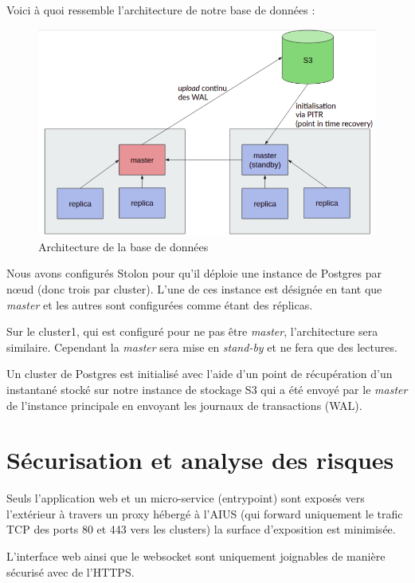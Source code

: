 Voici à quoi ressemble l'architecture de notre base de données :

\begin{figure}[h]
  \caption{\label{db-arch} Architecture de la base de données}
  \includegraphics[width=15cm]{images/database-arch}
\end{figure}

Nous avons configurés Stolon pour qu'il déploie une instance de Postgres
par nœud (donc trois par cluster). L'une de ces instance est désignée en
tant que \textit{master} et les autres sont configurées comme étant des
réplicas.

Sur le cluster1, qui est configuré pour ne pas être \textit{master},
l'architecture sera similaire. Cependant la \textit{master} sera mise en
\textit{stand-by} et ne fera que des lectures.

Un cluster de Postgres est initialisé avec l'aide d'un point de
récupération d'un instantané stocké sur notre instance de stockage S3
qui a été envoyé par le \textit{master} de l'instance principale en
envoyant les journaux de transactions (WAL).

\section{Sécurisation et analyse des risques}

Seuls l'application web et un micro-service (entrypoint) sont exposés
vers l'extérieur à travers un proxy hébergé à l'AIUS (qui forward
uniquement le trafic TCP des ports 80 et 443 vers les clusters) la
surface d'exposition est minimisée.

L'interface web ainsi que le websocket sont uniquement joignables de
manière sécurisé avec de l'HTTPS.

